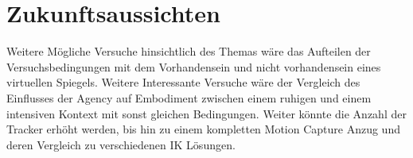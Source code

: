 \section{Zukunftsaussichten}
Weitere Mögliche Versuche hinsichtlich des Themas wäre das Aufteilen der Versuchsbedingungen mit dem Vorhandensein und nicht vorhandensein eines virtuellen Spiegels. Weitere Interessante Versuche wäre der Vergleich des Einflusses der Agency auf Embodiment zwischen einem ruhigen und einem intensiven Kontext mit sonst gleichen Bedingungen. Weiter könnte die Anzahl der Tracker erhöht werden, bis hin zu einem kompletten Motion Capture Anzug und deren Vergleich zu verschiedenen IK Lösungen.